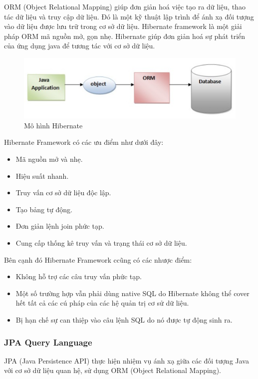 ORM (Object Relational Mapping) giúp đơn giản hoá việc tạo ra dữ liệu, thao tác dữ liệu và truy cập dữ liệu. Đó là một kỹ thuật lập trình để ánh xạ đối tượng vào dữ liệu được lưu trữ trong cơ sở dữ liệu. Hibernate framework là một giải pháp ORM mã nguồn mở, gọn nhẹ. Hibernate giúp đơn giản hoá sự phát triển của ứng dụng java để tương tác với cơ sở dữ liệu.\\
 \begin{figure}[H]
    \begin{center}
        \includegraphics[width=15cm]{Image/Technical/hibernate_module.png}
        \caption{Mô hình Hibernate}
        \label{spring}
    \end{center}
\end{figure}

Hibernate Framework có các ưu điểm như dưới đây:
\begin{itemize}
    \item Mã nguồn mở và nhẹ.
    \item Hiệu suất nhanh.
    \item Truy vấn cơ sở dữ liệu độc lập.
    \item Tạo bảng tự động.
    \item Đơn giản lệnh join phức tạp.
    \item Cung cấp thống kê truy vấn và trạng thái cơ sở dữ liệu.
\end{itemize}
Bên cạnh đó Hibernate Framework ccũng có các nhược điểm:
\begin{itemize}
    \item Không hỗ trợ các câu truy vấn phức tạp.
    \item Một số trường hợp vẫn phải dùng native SQL do Hibernate không thể cover hết tất cả các cú pháp của các hệ quản trị cơ sử dữ liệu.
    \item Bị hạn chế sự can thiệp vào câu lệnh SQL do nó được tự động sinh ra.
\end{itemize}

\subsubsection{JPA Query Language}
JPA (Java Persistence API) thực hiện nhiệm vụ ánh xạ giữa các đối tượng Java với cơ sở dữ liệu quan hệ, sử dụng ORM (Object Relational Mapping).\par

